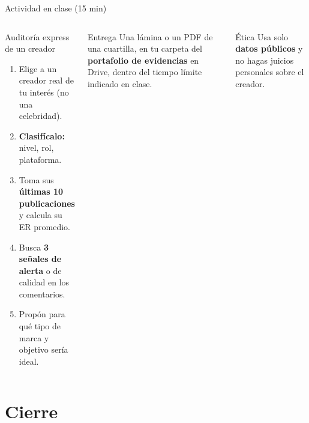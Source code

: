 \documentclass[aspectratio=169,xcolor=dvipsnames]{beamer}
\begin{document}
\begin{frame}{Actividad en clase (15 min)}
\begin{columns}[T]
  \begin{block}{Auditoría express de un creador}
    \small
    \begin{enumerate}
      \item Elige a un creador real de tu interés (no una celebridad).
      \item \textbf{Clasifícalo:} nivel, rol, plataforma.
      \item Toma sus \textbf{últimas 10 publicaciones} y calcula su ER promedio.
      \item Busca \textbf{3 señales de alerta} o de calidad en los comentarios.
      \item Propón para qué tipo de marca y objetivo sería ideal.
    \end{enumerate}
  \end{block}
  \begin{exampleblock}{Entrega}
    \small Una lámina o un PDF de una cuartilla, en tu carpeta del \textbf{portafolio de evidencias} en Drive, dentro del tiempo límite indicado en clase.
  \end{exampleblock}
  \begin{alertblock}{Ética}
    \small Usa solo \textbf{datos públicos} y no hagas juicios personales sobre el creador.
  \end{alertblock}
\end{columns}
\end{frame}

\section{Cierre}
\end{document}
